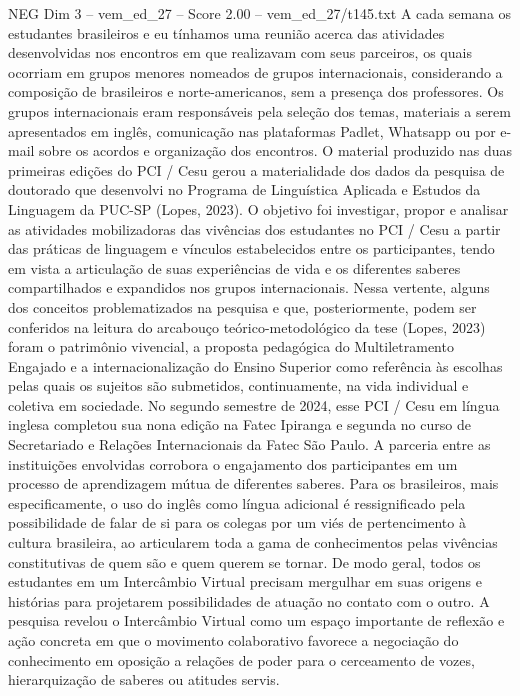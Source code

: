 \begin{textsample}{NEG Dim 3 – vem\_ed\_27 – Score 2.00 – vem\_ed\_27/t145.txt}
A cada semana os estudantes brasileiros e eu tínhamos uma reunião acerca das atividades desenvolvidas nos encontros em que realizavam com seus parceiros, os quais ocorriam em grupos menores nomeados de grupos internacionais, considerando a composição de brasileiros e norte-americanos, sem a presença dos professores.
Os grupos internacionais eram responsáveis pela seleção dos temas, materiais a serem apresentados em inglês, comunicação nas plataformas Padlet, Whatsapp ou por e-mail sobre os acordos e organização dos encontros.
O material produzido nas duas primeiras edições do PCI / Cesu gerou a materialidade dos dados da pesquisa de doutorado que desenvolvi no Programa de Linguística Aplicada e Estudos da Linguagem da PUC-SP (Lopes, 2023).
O objetivo foi investigar, propor e analisar as atividades mobilizadoras das vivências dos estudantes no PCI / Cesu a partir das práticas de linguagem e vínculos estabelecidos entre os participantes, tendo em vista a articulação de suas experiências de vida e os diferentes saberes compartilhados e expandidos nos grupos internacionais.
Nessa vertente, alguns dos conceitos problematizados na pesquisa e que, posteriormente, podem ser conferidos na leitura do arcabouço teórico-metodológico da tese (Lopes, 2023) foram o patrimônio vivencial, a proposta pedagógica do Multiletramento Engajado e a internacionalização do Ensino Superior como referência às escolhas pelas quais os sujeitos são submetidos, continuamente, na vida individual e coletiva em sociedade.
No segundo semestre de 2024, esse PCI / Cesu em língua inglesa completou sua nona edição na Fatec Ipiranga e segunda no curso de Secretariado e Relações Internacionais da Fatec São Paulo.
A parceria entre as instituições envolvidas corrobora o engajamento dos participantes em um processo de aprendizagem mútua de diferentes saberes.
Para os brasileiros, mais especificamente, o uso do inglês como língua adicional é ressignificado pela possibilidade de falar de si para os colegas por um viés de pertencimento à cultura brasileira, ao articularem toda a gama de conhecimentos pelas vivências constitutivas de quem são e quem querem se tornar.
De modo geral, todos os estudantes em um Intercâmbio Virtual precisam mergulhar em suas origens e histórias para projetarem possibilidades de atuação no contato com o outro.
A pesquisa revelou o Intercâmbio Virtual como um espaço importante de reflexão e ação concreta em que o movimento colaborativo favorece a negociação do conhecimento em oposição a relações de poder para o cerceamento de vozes, hierarquização de saberes ou atitudes servis.

\end{textsample}
